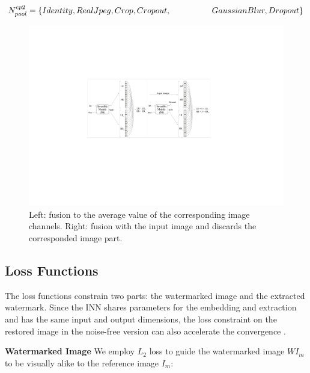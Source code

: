 \documentclass[sigconf]{acmart}
\begin{document}
$
    N^{cp2}_{pool} = \{Identity, RealJpeg, Crop, Cropout,  \\
    \hspace*{5em} GaussianBlur,  Dropout\}
$








\begin{figure} [t]
	\centering
	\includegraphics[width=1\linewidth]{picture/fusion_and_split.pdf}
	\caption{Left: fusion to the average value of the corresponding image channels. Right: fusion with the input image and discards the corresponded image part.}
	\label{fig:fusion and split}
\end{figure}









\subsection{Loss Functions}
The loss functions constrain two parts: the watermarked image and the extracted watermark. Since the INN shares parameters for the embedding and extraction and has the same input and output dimensions, the loss constraint on the restored image in the noise-free version can also accelerate the convergence \cite{ardizzone2018analyzing}.


\textbf{Watermarked Image}
We employ $L_{2}$ loss to guide the watermarked
image $WI_{m}$ to be visually alike to the reference image $I_{m}$:
\end{document}
